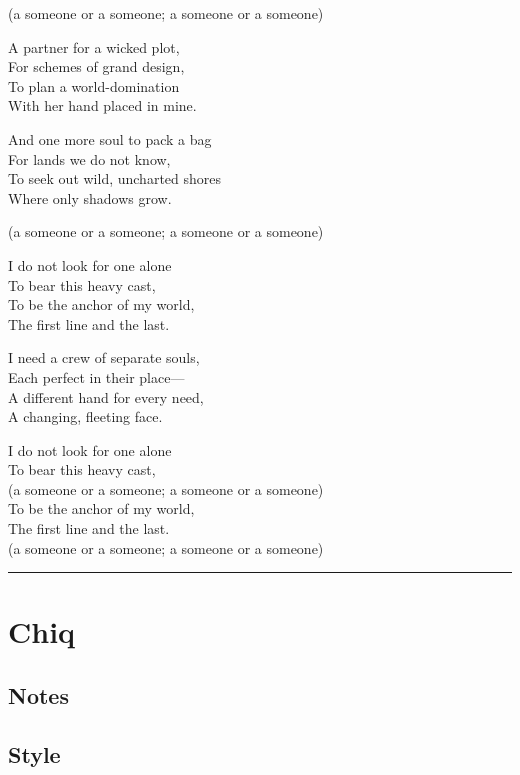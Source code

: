 \documentclass[]{article}
\begin{document}
(a someone or a someone; a someone or a someone)

A partner for a wicked plot,\\
For schemes of grand design,\\
To plan a world-domination\\
With her hand placed in mine.

And one more soul to pack a bag\\
For lands we do not know,\\
To seek out wild, uncharted shores\\
Where only shadows grow.

(a someone or a someone; a someone or a someone)

I do not look for one alone\\
To bear this heavy cast,\\
To be the anchor of my world,\\
The first line and the last.

I need a crew of separate souls,\\
Each perfect in their place---\\
A different hand for every need,\\
A changing, fleeting face.

I do not look for one alone\\
To bear this heavy cast,\\
(a someone or a someone; a someone or a someone)\\
To be the anchor of my world,\\
The first line and the last.\\
(a someone or a someone; a someone or a someone)

\begin{center}\rule{0.5\linewidth}{0.5pt}\end{center}

\section{Chiq}\label{chiq}

\subsection{Notes}\label{notes-2}

\subsection{Style}\label{style-2}
\end{document}
